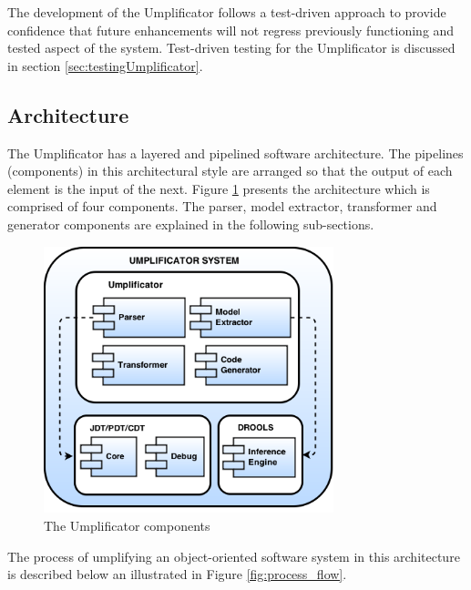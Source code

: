 The development of the Umplificator follows a test-driven approach to provide confidence that future enhancements will not regress previously functioning and tested aspect of the system. Test-driven testing for the Umplificator is discussed in section \ref{sec:testingUmplificator}. 

\subsection{Architecture}
\label{sec:architecture}

The Umplificator has a layered and pipelined software architecture. The pipelines (components) in this architectural style are arranged so that the output of each element is the input of the next.  Figure \ref{fig:architecture} presents the architecture which is comprised  of four components. The parser, model extractor, transformer and generator components are explained in the following sub-sections.

\begin{figure}[!t]
\centering
\includegraphics[width=0.75\textwidth]{Figures/UmplificatorComponents.png} 
\caption{The Umplificator components}
\label{fig:architecture}
\end{figure}

The process of umplifying an object-oriented software system in this architecture is described below an illustrated in Figure \ref{fig:process_flow}.

